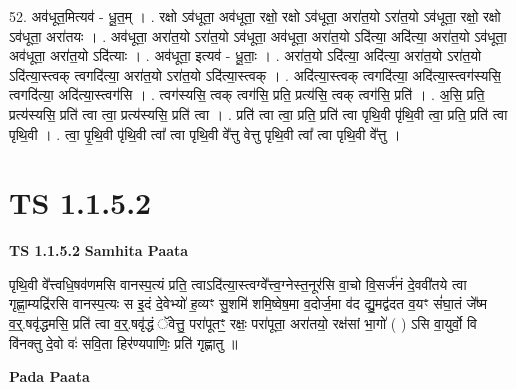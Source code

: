 \documentclass[17pt]{extarticle}
\begin{document}
52. अव॑धूत॒मित्यव॑ - धू॒त॒म् । . रक्षो ऽव॑धूता॒ अव॑धूता॒ रक्षो॒ रक्षो ऽव॑धूता॒ अरा॑त॒यो ऽरा॑त॒यो ऽव॑धूता॒ रक्षो॒ रक्षो ऽव॑धूता॒ अरा॑तयः । . अव॑धूता॒ अरा॑त॒यो ऽरा॑त॒यो ऽव॑धूता॒ अव॑धूता॒ अरा॑त॒यो ऽदि॑त्या॒ अदि॑त्या॒ अरा॑त॒यो ऽव॑धूता॒ अव॑धूता॒ अरा॑त॒यो ऽदि॑त्याः । . अव॑धूता॒ इत्यव॑ - धू॒ताः॒ । . अरा॑त॒यो ऽदि॑त्या॒ अदि॑त्या॒ अरा॑त॒यो ऽरा॑त॒यो ऽदि॑त्या॒स्त्वक् त्वगदि॑त्या॒ अरा॑त॒यो ऽरा॑त॒यो ऽदि॑त्या॒स्त्वक् । . अदि॑त्या॒स्त्वक् त्वगदि॑त्या॒ अदि॑त्या॒स्त्वग॑स्यसि॒ त्वगदि॑त्या॒ अदि॑त्या॒स्त्वग॑सि । . त्वग॑स्यसि॒ त्वक् त्वग॑सि॒ प्रति॒ प्रत्य॑सि॒ त्वक् त्वग॑सि॒ प्रति॑ । . अ॒सि॒ प्रति॒ प्रत्य॑स्यसि॒ प्रति॑ त्वा त्वा॒ प्रत्य॑स्यसि॒ प्रति॑ त्वा । . प्रति॑ त्वा त्वा॒ प्रति॒ प्रति॑ त्वा पृथि॒वी पृ॑थि॒वी त्वा॒ प्रति॒ प्रति॑ त्वा पृथि॒वी । . त्वा॒ पृ॒थि॒वी पृ॑थि॒वी त्वा᳚ त्वा पृथि॒वी वे᳚त्तु वेत्तु पृथि॒वी त्वा᳚ त्वा पृथि॒वी वे᳚त्तु । \newline
\pagebreak
{}

\section{ TS 1.1.5.2 }

\textbf{TS 1.1.5.2 } \newline
\textbf{Samhita Paata} \newline

पृथि॒वी वे᳚त्त्वधि॒षव॑णमसि वानस्प॒त्यं प्रति॒ त्वाऽदि॑त्या॒स्त्वग्वे᳚त्त्व॒ग्नेस्त॒नूर॑सि वा॒चो वि॒सर्ज॑नं दे॒ववी॑तये त्वा गृह्णा॒म्यद्रि॑रसि वानस्प॒त्यः स इ॒दं दे॒वेभ्यो॑ ह॒व्यꣳ सु॒शमि॑ शमि॒ष्वेष॒मा व॒दोर्ज॒मा व॑द द्यु॒मद्व॑दत व॒यꣳ सं॑घा॒तं जे᳚ष्म व॒र्॒.षवृ॑द्धमसि॒ प्रति॑ त्वा व॒र्॒.षवृ॑द्धं ॅवेत्तु॒ परा॑पूतꣳ॒॒ रक्षः॒ परा॑पूता॒ अरा॑तयो॒ रक्ष॑सां भा॒गो॑ ( ) ऽसि वा॒युर्वो॒ वि वि॑नक्तु दे॒वो वः॑ सवि॒ता हिर॑ण्यपाणिः॒ प्रति॑ गृह्णातु ॥ \newline

\textbf{Pada Paata} \newline
\end{document}
